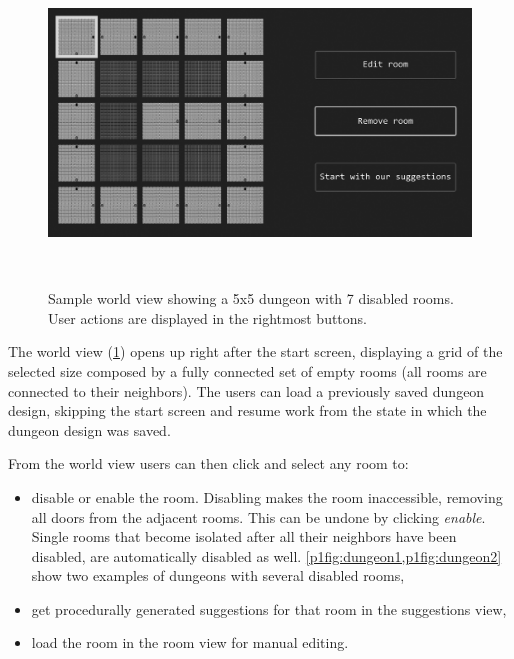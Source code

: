 \begin{figure}[t]
    \centering
    \includegraphics[width=\columnwidth]{included-papers-tex/paper-1/figures-extra/world-edited.png}
    \caption{Sample world view showing a 5x5 dungeon with 7 disabled rooms. User actions are displayed in the rightmost buttons.}~\label{p1fig:world}
\end{figure}

The world view (\cref{p1fig:world}) opens up right after the start screen, displaying a grid of the selected size composed by a fully connected set of empty rooms (all rooms are connected to their neighbors). The users can load a previously saved dungeon design, skipping the start screen and resume work from the state in which the dungeon design was saved.

From the world view users can then click and select any room to:
\begin{itemize}
\item disable or enable the room. Disabling makes the room inaccessible, removing all doors from the adjacent rooms. This can be undone by clicking \emph{enable}. Single rooms that become isolated after all their neighbors have been disabled, are automatically disabled as well. \cref{p1fig:dungeon1,p1fig:dungeon2} show two examples of dungeons with several disabled rooms,
\item get procedurally generated suggestions for that room in the suggestions view,
\item load the room in the room view for manual editing.
\end{itemize}

